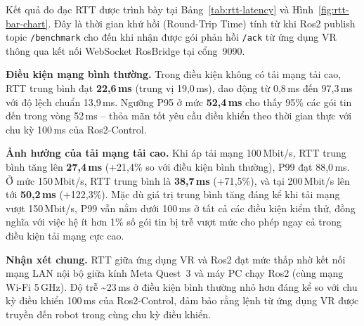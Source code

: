 Kết quả đo đạc RTT được trình bày tại Bảng~\ref{tab:rtt-latency} và Hình~\ref{fig:rtt-bar-chart}.
Đây là thời gian khứ hồi (Round-Trip Time) tính từ khi Ros2 publish topic
\texttt{/benchmark} cho đến khi nhận được gói phản hồi \texttt{/ack}
từ ứng dụng VR thông qua kết nối WebSocket RosBridge tại cổng~9090.

\textbf{Điều kiện mạng bình thường.}
Trong điều kiện không có tải mạng tải cao, RTT trung bình đạt
\textbf{22{,}6\,ms} (trung vị 19{,}0\,ms),
dao động từ 0{,}8\,ms đến 97{,}3\,ms với độ lệch chuẩn
13{,}9\,ms.
Ngưỡng P95 ở mức \textbf{52{,}4\,ms} cho thấy 95\% các gói tin
đến trong vòng 52\,ms -- thỏa mãn tốt yêu cầu điều khiển
theo thời gian thực với chu kỳ 100\,ms của Ros2-Control.

\textbf{Ảnh hưởng của tải mạng tải cao.}
Khi áp tải mạng 100\,Mbit/s, RTT trung bình tăng lên
\textbf{27{,}4\,ms} (+21{,}4\%
so với điều kiện bình thường), P99 đạt 88{,}0\,ms.
Ở mức 150\,Mbit/s, RTT trung bình là \textbf{38{,}7\,ms}
(+71{,}5\%),
và tại 200\,Mbit/s lên tới \textbf{50{,}2\,ms}
(+122{,}3\%).
Mặc dù giá trị trung bình tăng đáng kể khi tải mạng vượt 150\,Mbit/s,
P99 vẫn nằm dưới 100\,ms ở tất cả các điều kiện kiểm thử,
đồng nghĩa với việc hệ ít hơn 1\% số gói tin bị trễ vượt mức cho phép
ngay cả trong điều kiện tải mạng cực cao.

\textbf{Nhận xét chung.}
RTT giữa ứng dụng VR và Ros2 đạt mức thấp nhờ kết nối mạng LAN nội bộ
giữa kính Meta Quest~3 và máy PC chạy Ros2 (cùng mạng Wi-Fi 5\,GHz).
Độ trễ \textasciitilde23\,ms ở điều kiện bình thường
nhỏ hơn đáng kể so với chu kỳ điều khiển 100\,ms của Ros2-Control,
đảm bảo rằng lệnh từ ứng dụng VR được truyền đến robot trong cùng chu kỳ điều khiển.
